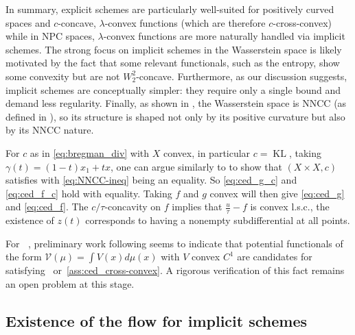 \documentclass[reqno]{amsart}
\theoremstyle{plain}
\theoremstyle{remark}
\theoremstyle{plain}
\numberwithin{equation}{section}
\theoremstyle{remark}
\newenvironment{continuance}[1]
  {\newcommand\continuanceref{\ref{#1}}\continuancex}
  {\endcontinuancex}
\DeclareMathOperator{\KL}{KL}
\DeclareMathOperator{\Seps}{S_\epsilon}
\begin{document}
\begin{continuance}{ex:distance}
In summary, explicit schemes are particularly well-suited for positively curved spaces and $c$-concave, $\lambda$-convex functions (which are therefore $c$-cross-convex) while in NPC spaces, $\lambda$-convex functions are more naturally handled via implicit schemes. The strong focus on implicit schemes in the Wasserstein space is likely motivated by the fact that some relevant functionals, such as the entropy, show some convexity but are not $W_2^2$-concave. Furthermore, as our discussion suggests, implicit schemes are conceptually simpler: they require only a single bound and demand less regularity. Finally, as shown in \cite[Theorem 3.11]{leger2024nonnegative}, the Wasserstein space is NNCC (as defined in ), so its structure is shaped not only by its positive curvature but also by its NNCC nature.
\end{continuance}

\begin{continuance}{ex:KL}\label{ex:KL_sec3} For $c$ as in \eqref{eq:bregman_div} with $X$ convex, in particular $c=\KL$, taking $\gamma(t)=(1-t)x_1+tx$, one can argue similarly to \cite[Example 2.9]{leger2024nonnegative} to show that $(X\times X,c)$ satisfies  with \eqref{eq:NNCC-ineq}  being  an equality. So \eqref{eq:ced_g_c} and \eqref{eq:ced_f_c} hold with equality. Taking $f$ and $g$ convex will then give \eqref{eq:ced_g} and \eqref{eq:ced_f}. The $c/\tau$-concavity on $f$ implies that $\frac{u}{\tau}-f$ is convex l.s.c., the existence of $z(t)$ corresponds to having a nonempty subdifferential at all points.

\end{continuance}

\begin{continuance}{ex:Sinkhorn} For $\Seps$, preliminary work following \cite{lavenant2024riemannian} seems to indicate that potential functionals of the form $\mathcal{V}(\mu)=\int V(x)d\mu(x)$ with $V$ convex $C^1$  are  candidates for satisfying ~or~\ref{ass:ced_cross-convex}.  A rigorous verification of this fact remains an open problem at this stage. 

\end{continuance}



\subsection{Existence of the flow for implicit schemes}\label{sec:f=0}
\end{document}
